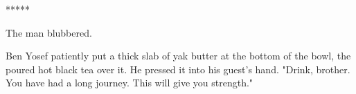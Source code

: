 \documentclass{amsart}
\begin{document}
\begin{comment}
Eventually, when he was certain that she would not encounter any neighbors if she walked home, he went to wake his guest up. She lay there, sweat and blood and dirt mixing to stain her body with mud. With her hair matted and snarled, still stinking of alcohol, she could have passed for a female version of her husband. The thought gave him pause. How different the world could have been if they had met at a different point in time. If it truly could have been the two of them who were the opposite sides of a coin, and not \emph{that} being. He loved her, he realized, though that wasn't knew. Though how deeply he still felt for her still, possibly was.  But she had staked her position about their relationship, and that was an end to the matter. He shook her gently awake, and told her to go home, which she did.

Her decision to revert to her old name still made him uncomfortable. Her defiance of Their superiority terrified him. More immediately, their neighbors would tear them apart, and whatever else, they were still trapped in this prison with the others for all eternity. She wasn't afraid anymore, yet he still was. He didn't know what to do with that.

Yet she'd called him her better self, and that comforted him. They were friends, only, and that disappointed him, but they had been friends now for longer than she and Shiva had been intertwined. Well \emph{that} was an interesting realization, he thought, and took another gulp of wine, spitting out the dregs that had drifted into his mouth. And she, in her own twisted definition of the word, had forgiven Shiva for his torments, and perhaps even, she had forgiven Them. She had simply stopped letting her husband's and Their actions affect her any longer. If an all powerful force could be forgiven, maybe there was something of himself that had rubbed off onto her, just as a bit of Shiva had. He hoped so, and he hoped that he was right. That somewhere in the wide gap between their two personas was the way out of this hell.
\end{comment}

\begin{center}*****\end{center}

The man blubbered. 

Ben Yosef patiently put a thick slab of yak butter at the bottom of the bowl, the poured hot black tea over it. He pressed it into his guest's hand. "Drink, brother. You have had a long journey. This will give you strength." 
\end{document}
